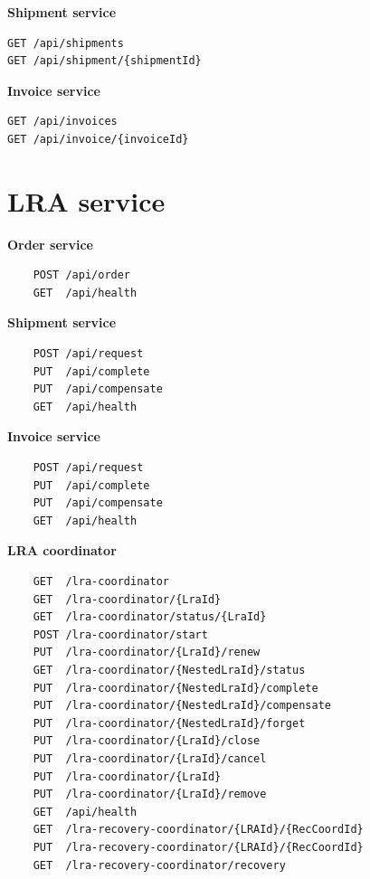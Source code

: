 \documentclass[oneside,
  digital, %
  table,   %
  lof,     %
  lot,     %
]{fithesis3}
\begin{document}
\noindent
\textbf{Shipment service}

\begin{verbatim}
GET /api/shipments
GET /api/shipment/{shipmentId}
\end{verbatim}

\noindent
\textbf{Invoice service}

\begin{verbatim}
GET /api/invoices
GET /api/invoice/{invoiceId}
\end{verbatim}

\section{LRA service}

\textbf{Order service}

\begin{verbatim}
    POST /api/order
    GET  /api/health
\end{verbatim}

\noindent
\textbf{Shipment service}

\begin{verbatim}
    POST /api/request
    PUT  /api/complete
    PUT  /api/compensate
    GET  /api/health
\end{verbatim}

\noindent
\textbf{Invoice service}

\begin{verbatim}
    POST /api/request
    PUT  /api/complete
    PUT  /api/compensate
    GET  /api/health
\end{verbatim}

\noindent
\textbf{LRA coordinator}

\begin{verbatim}
    GET  /lra-coordinator
    GET  /lra-coordinator/{LraId}
    GET  /lra-coordinator/status/{LraId}
    POST /lra-coordinator/start
    PUT  /lra-coordinator/{LraId}/renew
    GET  /lra-coordinator/{NestedLraId}/status
    PUT  /lra-coordinator/{NestedLraId}/complete
    PUT  /lra-coordinator/{NestedLraId}/compensate
    PUT  /lra-coordinator/{NestedLraId}/forget
    PUT  /lra-coordinator/{LraId}/close
    PUT  /lra-coordinator/{LraId}/cancel
    PUT  /lra-coordinator/{LraId}
    PUT  /lra-coordinator/{LraId}/remove
    GET  /api/health
    GET  /lra-recovery-coordinator/{LRAId}/{RecCoordId}
    PUT  /lra-recovery-coordinator/{LRAId}/{RecCoordId}
    GET  /lra-recovery-coordinator/recovery
\end{verbatim}
\end{document}
